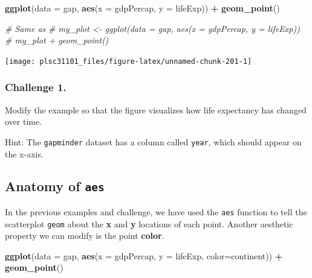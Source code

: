 \documentclass[]{book}
\newenvironment{Shaded}{\begin{snugshade}}{\end{snugshade}}
\newcommand{\KeywordTok}[1]{\textcolor[rgb]{0.13,0.29,0.53}{\textbf{#1}}}
\newcommand{\DataTypeTok}[1]{\textcolor[rgb]{0.13,0.29,0.53}{#1}}
\newcommand{\StringTok}[1]{\textcolor[rgb]{0.31,0.60,0.02}{#1}}
\newcommand{\CommentTok}[1]{\textcolor[rgb]{0.56,0.35,0.01}{\textit{#1}}}
\newcommand{\OperatorTok}[1]{\textcolor[rgb]{0.81,0.36,0.00}{\textbf{#1}}}
\newcommand{\NormalTok}[1]{#1}
\begin{document}
\begin{Shaded}
\begin{Highlighting}[]
\KeywordTok{ggplot}\NormalTok{(}\DataTypeTok{data =}\NormalTok{ gap, }\KeywordTok{aes}\NormalTok{(}\DataTypeTok{x =}\NormalTok{ gdpPercap, }\DataTypeTok{y =}\NormalTok{ lifeExp)) }\OperatorTok{+}\StringTok{ }
\StringTok{  }\KeywordTok{geom_point}\NormalTok{()}

\CommentTok{# Same as}
\CommentTok{# my_plot <- ggplot(data = gap, aes(x = gdpPercap, y = lifeExp))}
\CommentTok{# my_plot + geom_point()}
\end{Highlighting}
\end{Shaded}

\begin{center}\texttt{[image: plsc31101\_files/figure-latex/unnamed-chunk-201-1]} \end{center}

\subsubsection*{Challenge 1.}\label{challenge-1.-6}

Modify the example so that the figure visualizes how life expectancy has
changed over time.

Hint: The \texttt{gapminder} dataset has a column called \texttt{year},
which should appear on the x-axis.

\subsection{\texorpdfstring{Anatomy of
\texttt{aes}}{Anatomy of aes}}\label{anatomy-of-aes}

In the previous examples and challenge, we have used the \texttt{aes}
function to tell the scatterplot \texttt{geom} about the \textbf{x} and
\textbf{y} locations of each point. Another aesthetic property we can
modify is the point \textbf{color}.

\begin{Shaded}
\begin{Highlighting}[]
\KeywordTok{ggplot}\NormalTok{(}\DataTypeTok{data =}\NormalTok{ gap, }\KeywordTok{aes}\NormalTok{(}\DataTypeTok{x =}\NormalTok{ gdpPercap, }\DataTypeTok{y =}\NormalTok{ lifeExp, }\DataTypeTok{color=}\NormalTok{continent)) }\OperatorTok{+}\StringTok{ }
\StringTok{  }\KeywordTok{geom_point}\NormalTok{()}
\end{Highlighting}
\end{Shaded}
\end{document}
